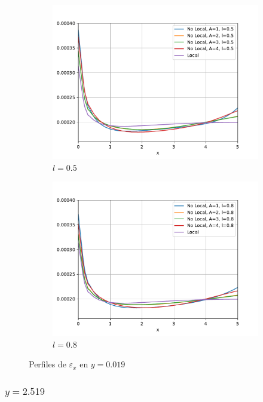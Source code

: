 \begin{figure}
\begin{subfigure}{0.48\textwidth}
		    \centering
		        \includegraphics[width=\textwidth]{figuras/Placa/Perfiles/Y/Y0.5_0.019.pdf}
		        \caption{$l=0.5$}
		        \label{fig:perfilesY0019.05}
		    \end{subfigure}
		    \begin{subfigure}{0.48\textwidth}
		    \centering
		        \includegraphics[width=\textwidth]{figuras/Placa/Perfiles/Y/Y0.8_0.019.pdf}
		        \caption{$l=0.8$}
		        \label{fig:perfilesY0019.08}
		    \end{subfigure}
		    \caption{Perfiles de $\varepsilon_x$ en $y=0.019$}
		    \label{fig:perfilesY0019}
		\end{figure}

	\subsubsection{\texorpdfstring{$y=2.519$}{y=2.519}}


